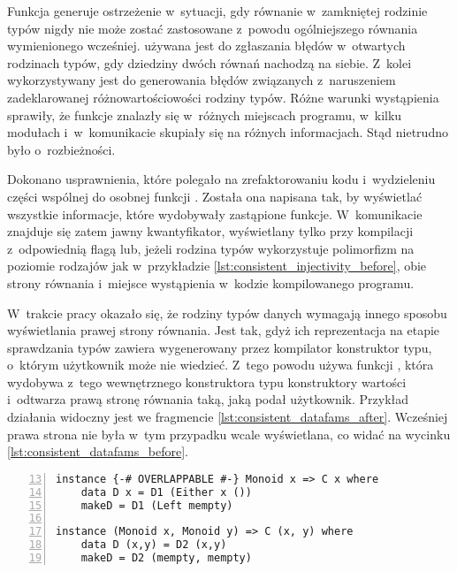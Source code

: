 Funkcja  generuje ostrzeżenie w~sytuacji, gdy równanie
w~zamkniętej rodzinie typów nigdy nie może zostać zastosowane z~powodu ogólniejszego
równania wymienionego wcześniej.
 używana jest do zgłaszania błędów w~otwartych rodzinach typów,
gdy dziedziny dwóch równań nachodzą na siebie.
Z~kolei  wykorzystywany jest do generowania błędów związanych
z~naruszeniem zadeklarowanej różnowartościowości rodziny typów.
Różne warunki wystąpienia sprawiły, że funkcje znalazły się w~różnych miejscach
programu, w~kilku modułach i~w~komunikacie skupiały się na różnych informacjach.
Stąd nietrudno było o~rozbieżności.

Dokonano usprawnienia, które polegało na zrefaktorowaniu kodu i~wydzieleniu
części wspólnej do osobnej funkcji .
Została ona napisana tak, by wyświetlać wszystkie
informacje, które wydobywały zastąpione funkcje. W~komunikacie znajduje się
zatem jawny kwantyfikator, wyświetlany tylko przy kompilacji z~odpowiednią flagą
lub, jeżeli rodzina typów wykorzystuje polimorfizm na poziomie rodzajów jak
w~przykładzie \ref{lst:consistent_injectivity_before}, obie strony równania
i~miejsce wystąpienia w~kodzie kompilowanego programu.

W~trakcie pracy okazało się, że rodziny typów danych wymagają innego sposobu
wyświetlania prawej strony równania. Jest tak, gdyż ich reprezentacja na etapie
sprawdzania typów zawiera wygenerowany przez kompilator konstruktor typu,
o~którym użytkownik może nie wiedzieć. Z~tego powodu  używa
funkcji , która wydobywa z~tego wewnętrznego konstruktora typu
konstruktory wartości i~odtwarza prawą stronę równania taką, jaką podał
użytkownik. Przykład działania widoczny jest we fragmencie
\ref{lst:consistent_datafams_after}. Wcześniej prawa strona nie była w~tym
przypadku wcale wyświetlana, co widać na wycinku
\ref{lst:consistent_datafams_before}.

\begin{lstlisting}[float,numbers=left,firstnumber=13,label={lst:consistent_datafams_code},
                   caption={Fragment testu T9371 z rodziną typów danych powiązaną z klasą \code{C} i równaniami o nachodzących na siebie dziedzinach.}]
instance {-# OVERLAPPABLE #-} Monoid x => C x where
    data D x = D1 (Either x ())
    makeD = D1 (Left mempty)

instance (Monoid x, Monoid y) => C (x, y) where
    data D (x,y) = D2 (x,y)
    makeD = D2 (mempty, mempty)
\end{lstlisting}

